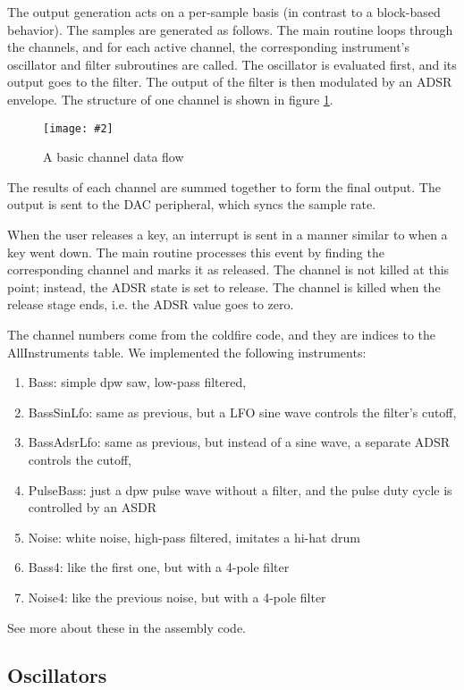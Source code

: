 \documentclass[10pt,a4paper,oneside]{article}
\newcommand{\kuvaa}[4]{%
	\begin{figure}[h]%
		\centering \texttt{[image: \#2]}%
		\caption{#3 \label{#4}}%
	\end{figure}%
}
\newcommand{\kuva}[2]{\kuvaa{0.99}{#1}{#2}{fig:#1}}
\begin{document}
The output generation acts on a per-sample basis (in contrast to a block-based behavior). The samples are generated as follows. The main routine loops through the channels, and for each active channel, the corresponding instrument's oscillator and filter subroutines are called. The oscillator is evaluated first, and its output goes to the filter. The output of the filter is then modulated by an ADSR envelope. The structure of one channel is shown in figure \ref{fig:channel}.

\kuva{channel}{A basic channel data flow}

The results of each channel are summed together to form the final output. The output is sent to the DAC peripheral, which syncs the sample rate.

When the user releases a key, an interrupt is sent in a manner similar to when a key went down. The main routine processes this event by finding the corresponding channel and marks it as released. The channel is not killed at this point; instead, the ADSR state is set to release. The channel is killed when the release stage ends, i.e. the ADSR value goes to zero.

The channel numbers come from the coldfire code, and they are indices to the AllInstruments table. We implemented the following instruments:

\begin{enumerate}
	\item Bass: simple dpw saw, low-pass filtered,
	\item BassSinLfo: same as previous, but a LFO sine wave controls the filter's cutoff,
	\item BassAdsrLfo: same as previous, but instead of a sine wave, a separate ADSR controls the cutoff,
	\item PulseBass: just a dpw pulse wave without a filter, and the pulse duty cycle is controlled by an ASDR
	\item Noise: white noise, high-pass filtered, imitates a hi-hat drum
	\item Bass4: like the first one, but with a 4-pole filter
	\item Noise4: like the previous noise, but with a 4-pole filter
\end{enumerate}

See more about these in the assembly code.

\subsection{Oscillators}
\end{document}
